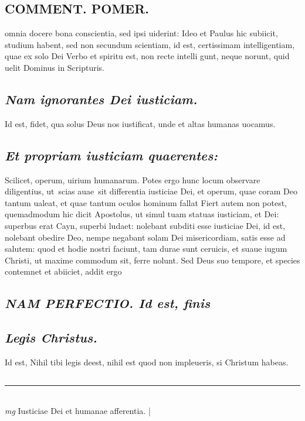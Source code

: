 \documentclass{article}
\begin{document}
\begin{pages}
\section*{COMMENT. POMER.  }\pstart omnia docere bona conscientia, sed ipsi uiderint: Ideo et Paulus hic subiicit, studium habent, sed non secundum scientiam, id est, certissimam intelligentiam, quae ex solo Dei Verbo et spiritu est, non recte intelli gunt, neque norunt, quid uelit Dominus in Scripturis.  \pend
{}
{}
\subsection*{\textit{Nam ignorantes Dei iusticiam. }}\pstart Id est, fidet, qua solus Deus nos iustificat, unde et altas humanas uocamus.   \pend
{}
{}
\subsection*{\textit{Et propriam iusticiam quaerentes: }}\pstart Scilicet, operum, uirium humanarum. Potes ergo hunc locum observare diligentius, ut scias auae sit differentia iusticiae Dei, et operum, quae coram Deo tantum ualeat, et quae tantum oculos hominum fallat Fiert autem non potest, quemadmodum hic dicit Apostolus, ut simul tuam statuas iusticiam, et Dei: superbus erat Cayn, superbi ludaet: nolebant subditi esse iusticiae Dei, id est, nolebant obedire Deo, nempe negabant solam Dei misericordiam, satis esse ad salutem: quod et hodie nostri faciunt, tam durae sunt ceruicis, et suaue iugum Christi, ut maxime commodum sit, ferre nolunt. Sed Deus suo tempore, et species contemnet et abiiciet, addit ergo  \pend
{}
{}
\subsection*{\textit{NAM PERFECTIO. Id est, finis }}
{}
\subsection*{\textit{Legis Christus. }}\pstart Id est, Nihil tibi legis deest, nihil est quod non impleueris, si Christum habeas.  \pend
{}
{}
\subsection*{\textit{}}
\vspace{0.5cm}\noindent
\vspace{0.2cm}\rule{1cm}{0.2pt}\\ 
\hspace{0.2cm}\textit{mg}
\footnotesize Iusticiae Dei et humanae afferentia.  
\normalsize| 

\end{pages}
\end{document}
